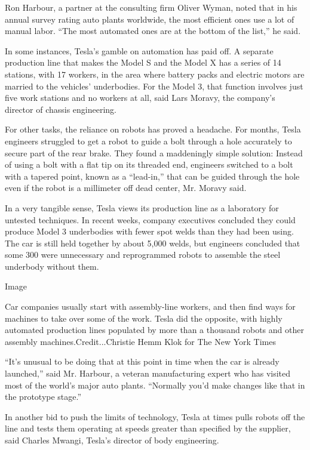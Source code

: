 Ron Harbour, a partner at the consulting firm Oliver Wyman, noted that
in his annual survey rating auto plants worldwide, the most efficient
ones use a lot of manual labor. ``The most automated ones are at the
bottom of the list,'' he said.

In some instances, Tesla's gamble on automation has paid off. A separate
production line that makes the Model S and the Model X has a series of
14 stations, with 17 workers, in the area where battery packs and
electric motors are married to the vehicles' underbodies. For the Model
3, that function involves just five work stations and no workers at all,
said Lars Moravy, the company's director of chassis engineering.

For other tasks, the reliance on robots has proved a headache. For
months, Tesla engineers struggled to get a robot to guide a bolt through
a hole accurately to secure part of the rear brake. They found a
maddeningly simple solution: Instead of using a bolt with a flat tip on
its threaded end, engineers switched to a bolt with a tapered point,
known as a ``lead-in,'' that can be guided through the hole even if the
robot is a millimeter off dead center, Mr. Moravy said.

In a very tangible sense, Tesla views its production line as a
laboratory for untested techniques. In recent weeks, company executives
concluded they could produce Model 3 underbodies with fewer spot welds
than they had been using. The car is still held together by about 5,000
welds, but engineers concluded that some 300 were unnecessary and
reprogrammed robots to assemble the steel underbody without them.

Image

Car companies usually start with assembly-line workers, and then find
ways for machines to take over some of the work. Tesla did the opposite,
with highly automated production lines populated by more than a thousand
robots and other assembly machines.Credit...Christie Hemm Klok for The
New York Times

``It's unusual to be doing that at this point in time when the car is
already launched,'' said Mr. Harbour, a veteran manufacturing expert who
has visited most of the world's major auto plants. ``Normally you'd make
changes like that in the prototype stage.''

In another bid to push the limits of technology, Tesla at times pulls
robots off the line and tests them operating at speeds greater than
specified by the supplier, said Charles Mwangi, Tesla's director of body
engineering.

